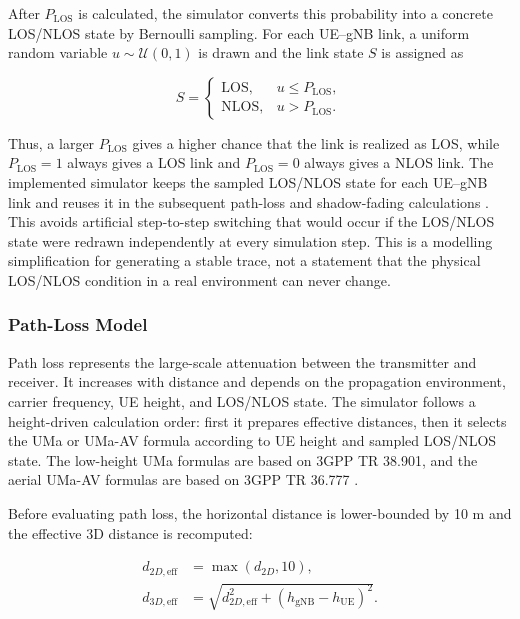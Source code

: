 After \(P_{\mathrm{LOS}}\) is calculated, the simulator converts this probability into a concrete LOS/NLOS state by Bernoulli sampling. For each UE--gNB link, a uniform random variable \(u\sim\mathcal{U}(0,1)\) is drawn and the link state \(S\) is assigned as

\begin{equation}
S=
\begin{cases}
\mathrm{LOS}, & u \le P_{\mathrm{LOS}},\\
\mathrm{NLOS}, & u > P_{\mathrm{LOS}}.
\end{cases}
\end{equation}

Thus, a larger \(P_{\mathrm{LOS}}\) gives a higher chance that the link is realized as LOS, while \(P_{\mathrm{LOS}}=1\) always gives a LOS link and \(P_{\mathrm{LOS}}=0\) always gives a NLOS link. The implemented simulator keeps the sampled LOS/NLOS state for each UE--gNB link and reuses it in the subsequent path-loss and shadow-fading calculations \cite{3gpp_36777}. This avoids artificial step-to-step switching that would occur if the LOS/NLOS state were redrawn independently at every simulation step. This is a modelling simplification for generating a stable trace, not a statement that the physical LOS/NLOS condition in a real environment can never change.

\subsubsection{Path-Loss Model}

Path loss represents the large-scale attenuation between the transmitter and receiver. It increases with distance and depends on the propagation environment, carrier frequency, UE height, and LOS/NLOS state. The simulator follows a height-driven calculation order: first it prepares effective distances, then it selects the UMa or UMa-AV formula according to UE height and sampled LOS/NLOS state. The low-height UMa formulas are based on 3GPP TR 38.901, and the aerial UMa-AV formulas are based on 3GPP TR 36.777 \cite{3gpp_38901,3gpp_36777}.

Before evaluating path loss, the horizontal distance is lower-bounded by 10 m and the effective 3D distance is recomputed:

\begin{align}
    d_{2D,\mathrm{eff}} &= \max(d_{2D},10),\\
    d_{3D,\mathrm{eff}} &=
    \sqrt{d_{2D,\mathrm{eff}}^2+
    (h_{\mathrm{gNB}}-h_{\mathrm{UE}})^2}.
\end{align}

